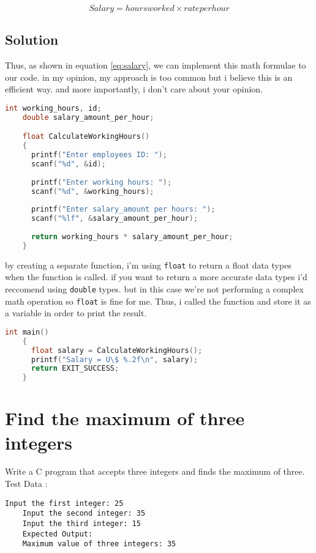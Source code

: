 \documentclass{article}
\begin{document}
  \begin{equation}
  Salary = hoursworked \times rateperhour
  \label{eq:salary}
  \end{equation}

  \subsection{Solution}

  Thus, as shown in equation \ref{eq:salary}, we can implement this math formulae to our code. in my opinion, my approach is too common but i believe this is an efficient way. and more importantly, i don't care about your opinion.
  \begin{lstlisting}[language=C, caption=Code Implementation]
    int working_hours, id;
    double salary_amount_per_hour;

    float CalculateWorkingHours()
    {
      printf("Enter employees ID: ");
      scanf("%d", &id);
      
      printf("Enter working hours: ");
      scanf("%d", &working_hours);
    
      printf("Enter salary_amount per hours: ");
      scanf("%lf", &salary_amount_per_hour);
    
      return working_hours * salary_amount_per_hour;
    }
  \end{lstlisting}
  by creating a separate function, i'm using \texttt{float} to return a float data types when the function is called. if you want to return a more accurate data types
  i'd reccomend using \texttt{double} types. but in this case we're not performing a complex math operation so \texttt{float} is fine for me.
  Thus, i called the function and store it as a variable in order to print the result. 
  \begin{lstlisting}[language=C, caption=Call the function]
    int main()
    {
      float salary = CalculateWorkingHours();
      printf("Salary = U\$ %.2f\n", salary);
      return EXIT_SUCCESS;
    }
  \end{lstlisting}

  \vfill\null

  \section{Find the maximum of three integers}
  
  Write a C program that accepts three integers and finds the maximum of three. Test Data :
  
  \begin{lstlisting}[style=plainstyle]
    Input the first integer: 25
    Input the second integer: 35
    Input the third integer: 15
    Expected Output:
    Maximum value of three integers: 35 
  \end{lstlisting}
\end{document}
